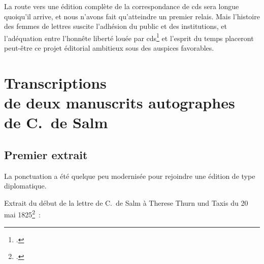 \documentclass[a4paper,12pt,twoside]{book}
\begin{document}
		La route vers une édition complète de la correspondance de \gls{cds} sera longue quoiqu'il arrive, et nous n'avons fait qu'atteindre un premier relais. Mais l'histoire des femmes de lettres suscite l'adhésion du public et des institutions, et l'adéquation entre l'\og honnête liberté \fg louée par \gls{cds}\footcite{CdS02045046} et l'esprit du temps placeront peut-être ce projet éditorial ambitieux sous des auspices favorables.
		
	\pagestyle{empty}
	\cleardoublepage		
				
	\appendix
	
	\renewcommand{\appendixpagename}{Annexes}
	
	\renewcommand{\appendixtocname}{Annexes}
	
	\addappheadtotoc%
	
	\appendixpage %
	
	\cleardoublepage
	\pagestyle{plain}			
	
	\chapter{Transcriptions \\de deux manuscrits autographes \\de C.~de Salm}
		\label{autographes}
		
		\section{Premier extrait}
	
			La ponctuation a été quelque peu modernisée pour rejoindre une édition de type diplomatique.
		
			Extrait du début de la lettre de C.~de Salm à Therese Thurn und Taxis du 20 mai 1825\footcite{CdS67022030}~:
			
\end{document}
